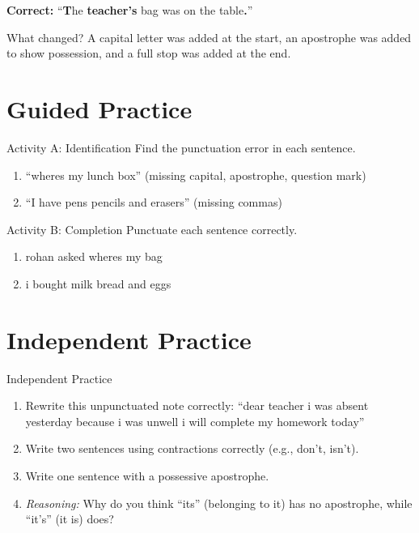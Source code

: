 \textbf{Correct:} ``\textbf{T}he \textbf{teacher's} bag was on the table\textbf{.}''

What changed? A capital letter was added at the start, an apostrophe was added to show possession, and a full stop was added at the end.

\section{Guided Practice}
\begin{activitybox}{Activity A: Identification}
Find the punctuation error in each sentence.
\begin{enumerate}
    \item ``wheres my lunch box'' (missing capital, apostrophe, question mark)
    \item ``I have pens pencils and erasers'' (missing commas)
\end{enumerate}
\end{activitybox}

\begin{activitybox}{Activity B: Completion}
Punctuate each sentence correctly.
\begin{enumerate}
    \item rohan asked wheres my bag
    \item i bought milk bread and eggs
\end{enumerate}
\end{activitybox}

\section{Independent Practice}
\begin{activitybox}{Independent Practice}
\begin{enumerate}
    \item Rewrite this unpunctuated note correctly: ``dear teacher i was absent yesterday because i was unwell i will complete my homework today''
    \item Write two sentences using contractions correctly (e.g., don't, isn't).
    \item Write one sentence with a possessive apostrophe.
    \item \textit{Reasoning:} Why do you think ``its'' (belonging to it) has no apostrophe, while ``it's'' (it is) does?
\end{enumerate}
\end{activitybox}

